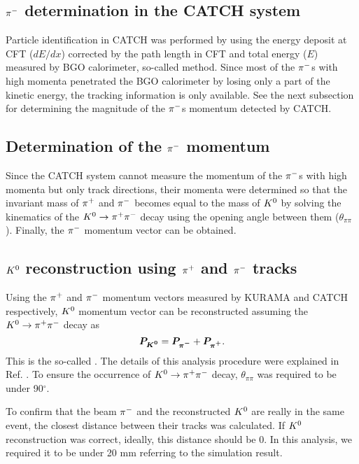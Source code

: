 \subsection{$\pi^{-}$ determination in the CATCH system}
Particle identification in CATCH was performed by using the energy deposit at CFT ($dE/dx$) corrected by the path length in CFT and total energy ($E$) measured by BGO calorimeter, so-called  method. Since most of the $\pi^{-}$s with high momenta penetrated the BGO calorimeter by losing only a part of the kinetic energy, the tracking information is only available. See the next subsection for determining the magnitude of the $\pi^{-}$s momentum detected by CATCH.

  
\subsection{Determination of the $\pi^{-}$ momentum}
Since the CATCH system cannot measure the momentum of the $\pi^{-}$s with high momenta but only track directions, their momenta were determined so that the invariant mass of $\pi^{+}$ and $\pi^{-}$ becomes equal to the mass of $K^{0}$ by solving the kinematics of the $K^0 \to \pi^+ \pi^-$ decay using the opening angle between them ($\theta_{\pi\pi}$). Finally, the $\pi^{-}$ momentum vector can be obtained. 
  
\subsection{$K^{0}$ reconstruction using $\pi^{+}$ and $\pi^{-}$ tracks}
Using the $\pi^{+}$ and $\pi^{-}$ momentum vectors measured by KURAMA and CATCH respectively, $K^{0}$ momentum vector can be reconstructed assuming the $K^0 \to \pi^+ \pi^-$ decay as
  \begin{equation}
    \bm{P_{K^{0}}} = \bm{P_{\pi^{-}}} + \bm{P_{\pi^{+}}}.
  \end{equation}
This is the so-called . The details of this analysis procedure were explained in Ref. \cite{Tamao-JPS}. To ensure the occurrence of $K^0 \to \pi^+ \pi^-$ decay, $\theta_{\pi\pi}$ was required to be under 90$^{\circ}$.

To confirm that the beam $\pi^{-}$ and the reconstructed $K^{0}$ are really in the same event, the closest distance between their tracks was calculated. If $K^{0}$ reconstruction was correct, ideally, this distance should be 0. In this analysis, we required it to be under 20 mm referring to the simulation result.

